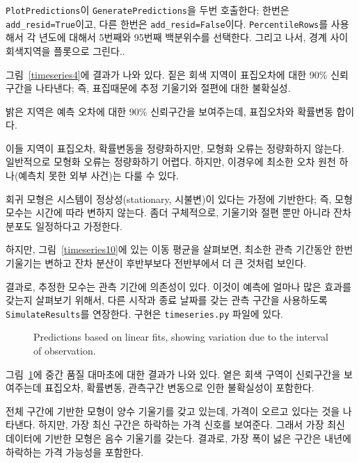 {\tt PlotPredictions}이 {\tt GeneratePredictions}을 두번 호출한다; 한번은 \verb"add_resid=True"이고, 다른 한번은 \verb"add_resid=False"이다.
{\tt PercentileRows}를 사용해서 각 년도에 대해서 5번째와 95번째 백분위수를 선택한다. 그리고 나서, 경계 사이 회색지역을 플롯으로 그린다..

그림~\ref{timeseries4}에 결과가 나와 있다.
짙은 회색 지역이 표집오차에 대한 90\% 신뢰구간을 나타낸다; 즉,
표집때문에 추정 기울기와 절편에 대한 불확실성.

밝은 지역은 예측 오차에 대한 90\% 신뢰구간을 보여주는데,
표집오차와 확률변동 합이다.

이들 지역이 표집오차, 확률변동을 정량화하지만, 모형화 오류는 정량화하지 않는다. 일반적으로 모형화 오류는 정량화하기 어렵다. 하지만, 이경우에 최소한 오차 원천 하나(예측치 못한 외부 사건)는 다룰 수 있다.

회귀 모형은 시스템이 정상성(stationary, 시불변)이 있다는 가정에 기반한다; 즉, 모형 모수는 시간에 따라 변하지 않는다.
좀더 구체적으로, 기울기와 절편 뿐만 아니라 잔차 분포도 일정하다고 가정한다.

하지만, 그림~\ref{timeseries10}에 있는 이동 평균을 살펴보면, 최소한 관측 기간동안 한번 기울기는 변하고 잔차 분산이 후반부보다 전반부에서 더 큰 것처럼 보인다.

결과로, 추정한 모수는 관측 기간에 의존성이 있다.
이것이 예측에 얼마나 많은 효과를 갖는지 살펴보기 위해서,
다른 시작과 종료 날짜를 갖는 관측 구간을 사용하도록 {\tt SimulateResults}를 연장한다.
구현은 {\tt timeseries.py} 파일에 있다.

\begin{figure}
\caption{Predictions based on linear fits, showing
variation due to the interval of observation.}
\label{timeseries5}
\end{figure}

그림~\ref{timeseries5}에 중간 품질 대마초에 대한 결과가 나와 있다.
옅은 회색 구역이 신뢰구간을 보여주는데 표집오차, 확률변동, 관측구간 변동으로 인한 불확실성이 포함한다.

전체 구간에 기반한 모형이 양수 기울기를 갖고 있는데, 가격이 오르고 있다는 것을 나타낸다. 하지만, 가장 최신 구간은 하락하는 가격 신호를 보여준다. 
그래서 가장 최신 데이터에 기반한 모형은 음수 기울기를 갖는다.
결과로, 가장 폭이 넗은 구간은 내년에 하락하는 가격 가능성을 포함한다.


